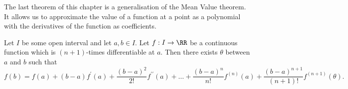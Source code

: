 \documentclass[../real_analysis.tex]{subfiles}
\begin{document}
        The last theorem of this chapter is a generalisation of the Mean Value theorem. It allows us to approximate the value of a function at a point as a polynomial with the derivatives of the function as coefficients.
        \begin{theorem}\label{taylors-thm}
            Let $I$ be some open interval and let $a,b\in I$. Let $f:I\to\RR$ be a continuous function which is $(n+1)$-times differentiable at $a$. Then there exists $\theta$ between $a$ and $b$ such that
            \begin{equation*}
                f(b)=f(a)+(b-a)f^\prime(a)+\frac{(b-a)^2}{2!}f^{\prime\prime}(a)+\dots+\frac{(b-a)^n}{n!}f^{(n)}(a)+\frac{(b-a)^{n+1}}{(n+1)!}f^{(n+1)}(\theta).
            \end{equation*}
        \end{theorem}
\end{document}
